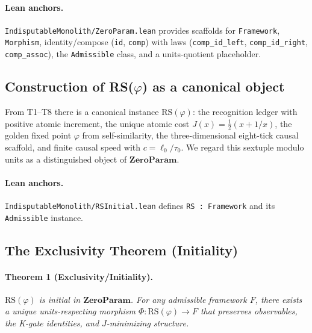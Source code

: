 \documentclass[11pt]{article}
\begin{document}
\paragraph{Lean anchors.} \texttt{IndisputableMonolith/ZeroParam.lean} provides scaffolds for \texttt{Framework}, \texttt{Morphism}, identity/compose (\texttt{id}, \texttt{comp}) with laws (\texttt{comp\_id\_left}, \texttt{comp\_id\_right}, \texttt{comp\_assoc}), the \texttt{Admissible} class, and a units\mbox{-}quotient placeholder.

\subsection{Construction of RS(\(\varphi\)) as a canonical object}
From T1--T8 there is a canonical instance \(\mathrm{RS}(\varphi)\): the recognition ledger with positive atomic increment, the unique atomic cost \(J(x)=\tfrac{1}{2}(x+1/x)\), the golden fixed point \(\varphi\) from self\mbox{-}similarity, the three\mbox{-}dimensional eight\mbox{-}tick causal scaffold, and finite causal speed with \(c=\ell_0/\tau_0\). We regard this sextuple modulo units as a distinguished object of \(\mathbf{ZeroParam}\).

\paragraph{Lean anchors.} \texttt{IndisputableMonolith/RSInitial.lean} defines \texttt{RS : Framework} and its \texttt{Admissible} instance.

\subsection{The Exclusivity Theorem (Initiality)}
\paragraph{Theorem 1 (Exclusivity/Initiality).} \emph{\(\mathrm{RS}(\varphi)\) is initial in \(\mathbf{ZeroParam}\). For any admissible framework \(F\), there exists a unique units\mbox{-}respecting morphism \(\Phi\colon \mathrm{RS}(\varphi)\to F\) that preserves observables, the K\mbox{-}gate identities, and \(J\)\mbox{-}minimizing structure.}
\end{document}
